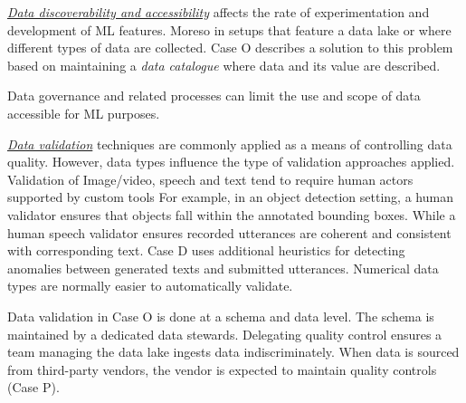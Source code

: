 \underline{\emph{Data discoverability and accessibility}}
affects the rate of experimentation and development of ML features. Moreso in setups that feature a data lake or where different types of data are collected. Case O describes a solution to this problem based on maintaining a \textit{data catalogue} where data and its value are described. %

Data governance and related processes can limit the use and scope of data accessible for ML purposes.


\underline{\emph{Data validation}}
techniques are commonly applied as a means of controlling data quality. However, data types influence the type of validation approaches applied. Validation of Image/video, speech and text tend to require human actors supported by custom tools For example, in an object detection setting, a human validator ensures that objects fall within the annotated bounding boxes. While a human speech validator ensures recorded utterances are coherent and consistent with corresponding text. Case D uses additional heuristics for detecting anomalies between generated texts and submitted utterances. Numerical data types are normally easier to automatically validate.

Data validation in Case O is done at a schema and data level. The schema is maintained by a dedicated data stewards. Delegating quality control ensures a team managing the data lake ingests data indiscriminately. When data is sourced from third-party vendors, the vendor is expected to maintain quality controls (Case P). %

